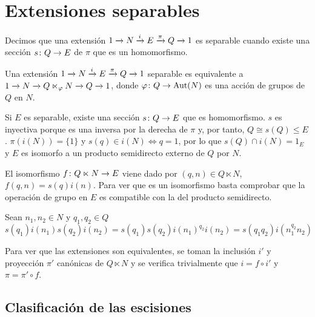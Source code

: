 
\section{Extensiones separables}\label{sec:split}


\begin{definicion}	
	Decimos que una extensión $\extension i \pi N E Q$ es separable cuando existe una sección $\homo s Q E$ de $\pi$ que es un homomorfismo.
\end{definicion}

\begin{teorema}\label{splitext}
	Una extensión $\extension i \pi N E Q$ separable es equivalente a $\extension {} {} N {Q\ltimes_{\varphi} N} Q$, donde $\homo \varphi Q \Aut(N)$ es una acción de grupos de $Q$ en $N$. %
	\begin{demostracion}
		Si $E$ es separable, existe una sección $\homo s Q E$ que es homomorfismo. $s$ es inyectiva porque es una inversa por la derecha de $\pi$ y, por tanto, $Q\cong s(Q) \leq E$.
		$\pi (i(N)) = \{1\}$ y $s(q)\in i(N) \iff q = 1$, por lo que $s(Q)\cap i(N) = {1_E}$ y $E$ es isomorfo a un producto semidirecto externo de $Q$ por $N$.
		
		El isomorfismo $\homo f {Q\ltimes N} E$ viene dado por $(q,n)\in Q\ltimes N$, $f(q,n) = s(q)i(n)$. Para ver que es un isomorfismo basta comprobar que la operación de grupo en $E$ es compatible con la del producto semidirecto.
		
		Sean $n_1,n_2\in N$ y $q_1,q_2\in Q$
		\begin{equation*}
			s(q_1)i(n_1)s(q_2)i(n_2) = s(q_1)s(q_2)i(n_1)^{q_2}i(n_2) = s(q_1q_2)i(n_1^{q_2}n_2) 
		\end{equation*}
		
		Para ver que las extensiones son equivalentes, se toman la inclusión $i'$ y proyección $\pi'$ canónicas de $Q\ltimes N$ y se verifica trivialmente que $i=f \circ i'$ y $\pi = \pi' \circ f$.
	\end{demostracion}
\end{teorema}


\subsection{Clasificación de las escisiones}

